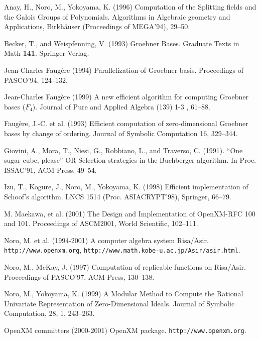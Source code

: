 \documentclass[runningheads]{cl2emult}
\begin{document}
\begin{thebibliography}{7}
%

Anay, H., Noro, M., Yokoyama, K. (1996)
Computation of the Splitting fields and the Galois Groups of Polynomials.
Algorithms in Algebraic geometry and Applications, 
Birkh\"auser (Proceedings of MEGA'94), 29--50.

Becker, T., and Weispfenning, V. (1993)
Groebner Bases.
Graduate Texts in Math {\bf 141}. Springer-Verlag.

Jean-Charles Faug\`ere (1994)
Parallelization of Groebner basis.
Proceedings of PASCO'94, 124--132.

Jean-Charles Faug\`ere (1999)
A new efficient algorithm for computing Groebner bases  ($F_4$).
Journal of Pure and Applied Algebra (139) 1-3 , 61--88.

Faug\`ere, J.-C. et al. (1993)
Efficient computation of zero-dimensional Groebner bases by change of ordering.
Journal of Symbolic Computation 16, 329--344.

Giovini, A., Mora, T., Niesi, G., Robbiano, L., and Traverso, C. (1991).
``One sugar cube, please'' OR Selection strategies in the Buchberger algorithm.
In Proc. ISSAC'91, ACM Press, 49--54.

Izu, T., Kogure, J., Noro, M., Yokoyama, K. (1998)     
Efficient implementation of Schoof's algorithm.
LNCS 1514 (Proc. ASIACRYPT'98), Springer, 66--79.

M. Maekawa, et al. (2001)
The Design and Implementation of OpenXM-RFC 100 and 101.
Proceedings of ASCM2001, World Scientific, 102--111.

Noro, M. et al. (1994-2001)
A computer algebra system Risa/Asir.
{\tt http://www.openxm.org}, {\tt http://www.math.kobe-u.ac.jp/Asir/asir.html}.

Noro, M., McKay, J. (1997)
Computation of replicable functions on Risa/Asir.
Proceedings of PASCO'97, ACM Press, 130--138.

Noro, M., Yokoyama, K. (1999)
A Modular Method to Compute the Rational Univariate
Representation of Zero-Dimensional Ideals.
Journal of Symbolic Computation, 28, 1, 243--263.

OpenXM committers (2000-2001)
OpenXM package.
{\tt http://www.openxm.org}.


\end{thebibliography}
\end{document}
